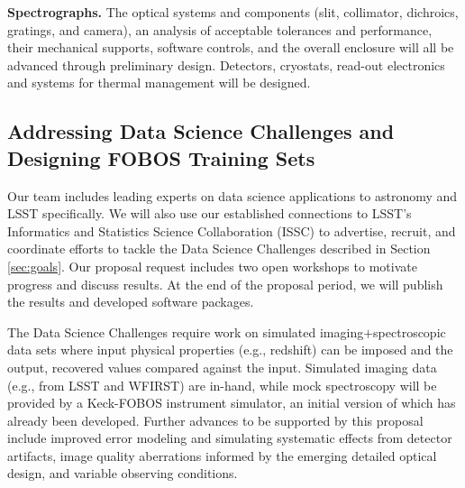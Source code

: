 \documentclass[oneside,11pt]{amsart}
\newcommand{\comment}[2][todo]{{\color{#1}[[{\bf #2}]]}}
\begin{document}
\noindent \textbf{Spectrographs.} The optical systems and components (slit, collimator, dichroics, gratings, and camera), an analysis of acceptable tolerances and performance, their mechanical supports, software controls, and the overall enclosure will all be advanced through preliminary design.  Detectors, cryostats, read-out electronics and systems for thermal management will be designed.




\subsection{Addressing Data Science Challenges and Designing FOBOS Training Sets}
\label{sec:survey}

Our team includes leading experts on data science applications to astronomy and LSST specifically.  We will also use
our established connections to LSST's Informatics and Statistics Science Collaboration (ISSC) to advertise, recruit,
and coordinate efforts to tackle the Data Science Challenges described in Section \ref{sec:goals}.  Our proposal
request includes two open workshops to motivate progress and discuss results. At the end of the proposal period, we
will publish the results and developed software packages.

The Data Science Challenges require work on simulated imaging$+$spectroscopic data sets where input physical properties
(e.g., redshift) can be imposed and the output, recovered values compared against the input.  Simulated imaging data
(e.g., from LSST and WFIRST) are in-hand, while mock spectroscopy will be provided by a Keck-FOBOS instrument simulator,
an initial version of which has already been developed.  Further advances to be supported by this proposal include
improved error modeling and simulating systematic effects from detector artifacts, image quality aberrations informed
by the emerging detailed optical design, and variable observing conditions.
\end{document}
